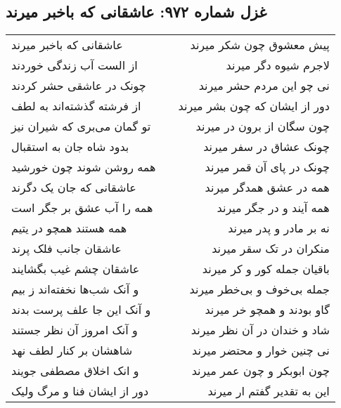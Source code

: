\begin{center}
\section*{غزل شماره ۹۷۲: عاشقانی که باخبر میرند}
\label{sec:0972}
\begin{longtable}{l p{0.5cm} r}
عاشقانی که باخبر میرند
&&
پیش معشوق چون شکر میرند
\\
از الست آب زندگی خوردند
&&
لاجرم شیوه دگر میرند
\\
چونک در عاشقی حشر کردند
&&
نی چو این مردم حشر میرند
\\
از فرشته گذشته‌اند به لطف
&&
دور از ایشان که چون بشر میرند
\\
تو گمان می‌بری که شیران نیز
&&
چون سگان از برون در میرند
\\
بدود شاه جان به استقبال
&&
چونک عشاق در سفر میرند
\\
همه روشن شوند چون خورشید
&&
چونک در پای آن قمر میرند
\\
عاشقانی که جان یک دگرند
&&
همه در عشق همدگر میرند
\\
همه را آب عشق بر جگر است
&&
همه آیند و در جگر میرند
\\
همه هستند همچو در یتیم
&&
نه بر مادر و پدر میرند
\\
عاشقان جانب فلک پرند
&&
منکران در تک سقر میرند
\\
عاشقان چشم غیب بگشایند
&&
باقیان جمله کور و کر میرند
\\
و آنک شب‌ها نخفته‌اند ز بیم
&&
جمله بی‌خوف و بی‌خطر میرند
\\
و آنک این جا علف پرست بدند
&&
گاو بودند و همچو خر میرند
\\
و آنک امروز آن نظر جستند
&&
شاد و خندان در آن نظر میرند
\\
شاهشان بر کنار لطف نهد
&&
نی چنین خوار و محتضر میرند
\\
و انک اخلاق مصطفی جویند
&&
چون ابوبکر و چون عمر میرند
\\
دور از ایشان فنا و مرگ ولیک
&&
این به تقدیر گفتم ار میرند
\\
\end{longtable}
\end{center}
